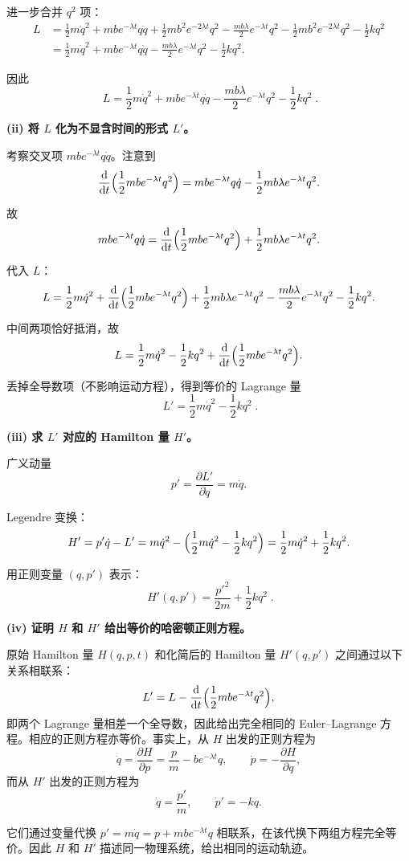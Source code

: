 \begin{question}
\begin{solution}
进一步合并 \(q^2\) 项：
\[
\begin{aligned}
L &= \frac12 m\dot q^2 + m b e^{-\lambda t} q\dot q
+ \frac12 m b^2 e^{-2\lambda t} q^2
- \frac{mb\lambda}{2} e^{-\lambda t} q^2
- \frac12 m b^2 e^{-2\lambda t} q^2 - \frac12 k q^2 \\[2mm]
&= \frac12 m\dot q^2 + m b e^{-\lambda t} q\dot q
- \frac{mb\lambda}{2} e^{-\lambda t} q^2 - \frac12 k q^2 .
\end{aligned}
\]

因此
\[
\boxed{\;L = \frac12 m\dot q^2 + m b e^{-\lambda t} q\dot q
- \frac{mb\lambda}{2} e^{-\lambda t} q^2 - \frac12 k q^2\;}.
\]

\textbf{(ii) 将 \(L\) 化为不显含时间的形式 \(L'\)。}

考察交叉项 \(m b e^{-\lambda t} q\dot q\)。注意到
\[
\frac{\mathrm d}{\mathrm d t}\Bigl(\frac12 m b e^{-\lambda t} q^2\Bigr)
= m b e^{-\lambda t} q\dot q - \frac12 m b \lambda e^{-\lambda t} q^2 .
\]

故
\[
m b e^{-\lambda t} q\dot q
= \frac{\mathrm d}{\mathrm d t}\Bigl(\frac12 m b e^{-\lambda t} q^2\Bigr)
+ \frac12 m b \lambda e^{-\lambda t} q^2 .
\]

代入 \(L\)：
\[
L = \frac12 m\dot q^2
+ \frac{\mathrm d}{\mathrm d t}\Bigl(\frac12 m b e^{-\lambda t} q^2\Bigr)
+ \frac12 m b \lambda e^{-\lambda t} q^2
- \frac{mb\lambda}{2} e^{-\lambda t} q^2 - \frac12 k q^2 .
\]

中间两项恰好抵消，故
\[
L = \frac12 m\dot q^2 - \frac12 k q^2 + \frac{\mathrm d}{\mathrm d t}\Bigl(\frac12 m b e^{-\lambda t} q^2\Bigr) .
\]

丢掉全导数项（不影响运动方程），得到等价的 Lagrange 量
\[
\boxed{\;L' = \frac12 m\dot q^2 - \frac12 k q^2\;}.
\]

\textbf{(iii) 求 \(L'\) 对应的 Hamilton 量 \(H'\)。}

广义动量
\[
p' = \frac{\partial L'}{\partial\dot q} = m\dot q .
\]

Legendre 变换：
\[
H' = p'\dot q - L' = m\dot q^2 - \Bigl(\frac12 m\dot q^2 - \frac12 k q^2\Bigr)
= \frac12 m\dot q^2 + \frac12 k q^2 .
\]

用正则变量 \((q,p')\) 表示：
\[
\boxed{\;H'(q,p') = \frac{p'^2}{2m} + \frac12 k q^2\;}.
\]

\textbf{(iv) 证明 \(H\) 和 \(H'\) 给出等价的哈密顿正则方程。}

原始 Hamilton 量 \(H(q,p,t)\) 和化简后的 Hamilton 量 \(H'(q,p')\) 之间通过以下关系相联系：
\[
L' = L - \frac{\mathrm d}{\mathrm d t}\Bigl(\frac12 m b e^{-\lambda t} q^2\Bigr),
\]
即两个 Lagrange 量相差一个全导数，因此给出完全相同的 Euler--Lagrange 方程。相应的正则方程亦等价。事实上，从 \(H\) 出发的正则方程为
\[
\dot q = \frac{\partial H}{\partial p} = \frac{p}{m} - b e^{-\lambda t} q,\qquad
\dot p = -\frac{\partial H}{\partial q},
\]
而从 \(H'\) 出发的正则方程为
\[
\dot q = \frac{p'}{m},\qquad
\dot p' = -k q .
\]

它们通过变量代换 \(p' = m\dot q = p + m b e^{-\lambda t} q\) 相联系，在该代换下两组方程完全等价。因此 \(H\) 和 \(H'\) 描述同一物理系统，给出相同的运动轨迹。
\end{solution}
\end{question}



